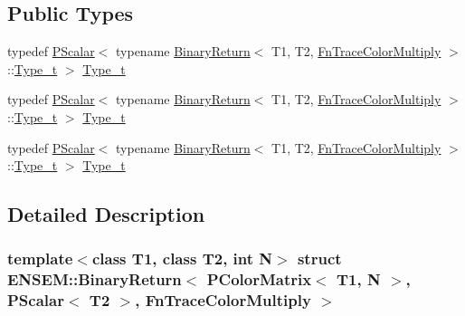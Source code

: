 \subsection*{Public Types}
\begin{DoxyCompactItemize}
\item 
typedef \mbox{\hyperlink{classENSEM_1_1PScalar}{P\+Scalar}}$<$ typename \mbox{\hyperlink{structENSEM_1_1BinaryReturn}{Binary\+Return}}$<$ T1, T2, \mbox{\hyperlink{structENSEM_1_1FnTraceColorMultiply}{Fn\+Trace\+Color\+Multiply}} $>$\+::\mbox{\hyperlink{structENSEM_1_1BinaryReturn_3_01PColorMatrix_3_01T1_00_01N_01_4_00_01PScalar_3_01T2_01_4_00_01FnTraceColorMultiply_01_4_a1bb599bba25314482b08c26d201a0672}{Type\+\_\+t}} $>$ \mbox{\hyperlink{structENSEM_1_1BinaryReturn_3_01PColorMatrix_3_01T1_00_01N_01_4_00_01PScalar_3_01T2_01_4_00_01FnTraceColorMultiply_01_4_a1bb599bba25314482b08c26d201a0672}{Type\+\_\+t}}
\item 
typedef \mbox{\hyperlink{classENSEM_1_1PScalar}{P\+Scalar}}$<$ typename \mbox{\hyperlink{structENSEM_1_1BinaryReturn}{Binary\+Return}}$<$ T1, T2, \mbox{\hyperlink{structENSEM_1_1FnTraceColorMultiply}{Fn\+Trace\+Color\+Multiply}} $>$\+::\mbox{\hyperlink{structENSEM_1_1BinaryReturn_3_01PColorMatrix_3_01T1_00_01N_01_4_00_01PScalar_3_01T2_01_4_00_01FnTraceColorMultiply_01_4_a1bb599bba25314482b08c26d201a0672}{Type\+\_\+t}} $>$ \mbox{\hyperlink{structENSEM_1_1BinaryReturn_3_01PColorMatrix_3_01T1_00_01N_01_4_00_01PScalar_3_01T2_01_4_00_01FnTraceColorMultiply_01_4_a1bb599bba25314482b08c26d201a0672}{Type\+\_\+t}}
\item 
typedef \mbox{\hyperlink{classENSEM_1_1PScalar}{P\+Scalar}}$<$ typename \mbox{\hyperlink{structENSEM_1_1BinaryReturn}{Binary\+Return}}$<$ T1, T2, \mbox{\hyperlink{structENSEM_1_1FnTraceColorMultiply}{Fn\+Trace\+Color\+Multiply}} $>$\+::\mbox{\hyperlink{structENSEM_1_1BinaryReturn_3_01PColorMatrix_3_01T1_00_01N_01_4_00_01PScalar_3_01T2_01_4_00_01FnTraceColorMultiply_01_4_a1bb599bba25314482b08c26d201a0672}{Type\+\_\+t}} $>$ \mbox{\hyperlink{structENSEM_1_1BinaryReturn_3_01PColorMatrix_3_01T1_00_01N_01_4_00_01PScalar_3_01T2_01_4_00_01FnTraceColorMultiply_01_4_a1bb599bba25314482b08c26d201a0672}{Type\+\_\+t}}
\end{DoxyCompactItemize}


\subsection{Detailed Description}
\subsubsection*{template$<$class T1, class T2, int N$>$\newline
struct E\+N\+S\+E\+M\+::\+Binary\+Return$<$ P\+Color\+Matrix$<$ T1, N $>$, P\+Scalar$<$ T2 $>$, Fn\+Trace\+Color\+Multiply $>$}

